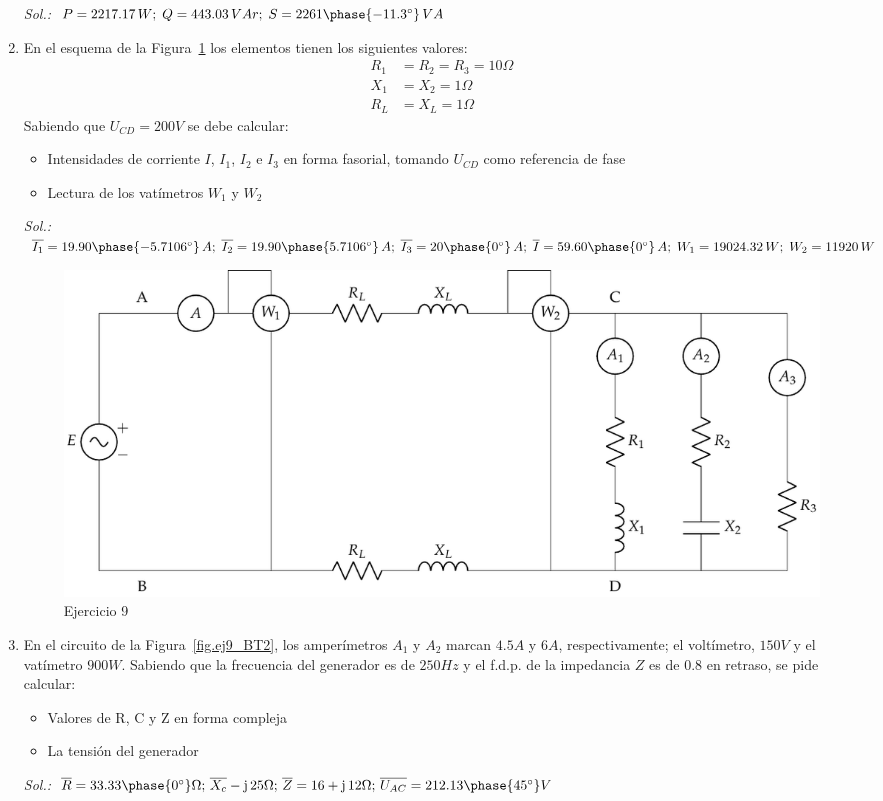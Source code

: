 \documentclass[11pt]{book} %
\begin{document}
\begin{enumerate}
\emph{Sol.: $P=2217.17\,W;\;Q=443.03\,VAr;\;S=2261\phase{-11.3^\circ}\,VA$}
\item En el esquema de la Figura~\ref{fig.ej8_BT2} los elementos tienen los siguientes valores:
\begin{align*}
    R_1 &= R_2 = R_3 = {10}{\Omega}\\
    X_1 &= X_2 = {1}{\Omega}\\
    R_L &= X_L = {1}{\Omega}
\end{align*}
Sabiendo que $U_{CD} = {200}{V}$ se debe calcular:
\begin{itemize}
\item Intensidades de corriente $I$, $I_1$, $I_2$ e $I_3$ {en forma fasorial}, tomando $U_{CD}$ como referencia de fase
\item Lectura de los vatímetros $W_1$ y $W_2$
\end{itemize}
\emph{Sol.: $\overline{I_1}=19.90\phase{-5.7106^\circ}\,A;\; \overline{I_2}=19.90\phase{5.7106^\circ}\,A;\; \overline{I_3}=20\phase{0^\circ}\,A;\;\overline{I}=59.60\phase{0^\circ}\,A;\;W_1=19024.32\,W;\; W_2=11920\,W$}
\begin{figure}[htbp]
    \centering
    \includegraphics[width=\linewidth]{../figs/ej8_BT2.pdf}
    \caption{Ejercicio 9}
    \label{fig.ej8_BT2}
\end{figure}
\item En el circuito de la Figura~\ref{fig.ej9_BT2}, los amperímetros $A_1$ y $A_2$ marcan ${4.5}{A}$ y ${6}{A}$, respectivamente; el voltímetro, ${150}{V}$ y el vatímetro ${900}{W}$. Sabiendo que la frecuencia del generador es de ${250}{Hz}$ y el f.d.p. de la impedancia $Z$ es de 0.8 en retraso, se pide calcular:
\begin{itemize}
\item Valores de R, C y Z en forma compleja
\item La tensión del generador
\end{itemize}
\emph{Sol.: $\overline{R}=33.33\phase{0^\circ}\Omega; \,\overline{X_c}-\mathrm{j}\,25\Omega;\,\overline{Z}=16+\mathrm{j}\,12\Omega;\,\overline{U_{AC}}=212.13\phase{45^\circ} V$}

\end{enumerate}
\end{document}
